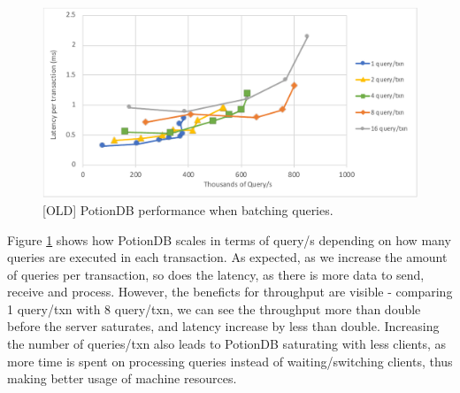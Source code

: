 \documentclass{vldb}
\newcommand{\grumbler}[2]{{\color{red}{\bf #1:} #2}}
\renewcommand{\grumbler}[2]{}
\newcommand{\andre}[1]{\grumbler{andre}{#1}}
\begin{document}

\begin{figure}
	\centering
	\includegraphics[width=.95\linewidth]{ops_per_txn_few_cut}
	\caption{[OLD] PotionDB performance when batching queries. %
	}
	\label{fig:ops_per_txn}
\end{figure}


Figure \ref{fig:ops_per_txn} shows how PotionDB scales in terms of query/s depending on how many queries are executed in each transaction.
As expected, as we increase the amount of queries per transaction, so does the latency, as there is more data to send, receive and process.
However, the beneficts for throughput are visible - comparing 1 query/txn with 8 query/txn, we can see the throughput more than double before the server saturates, and latency increase by less than double.
Increasing the number of queries/txn also leads to PotionDB saturating with less clients, as more time is spent on processing queries instead of waiting/switching clients, thus making better usage of machine resources.
\end{document}
